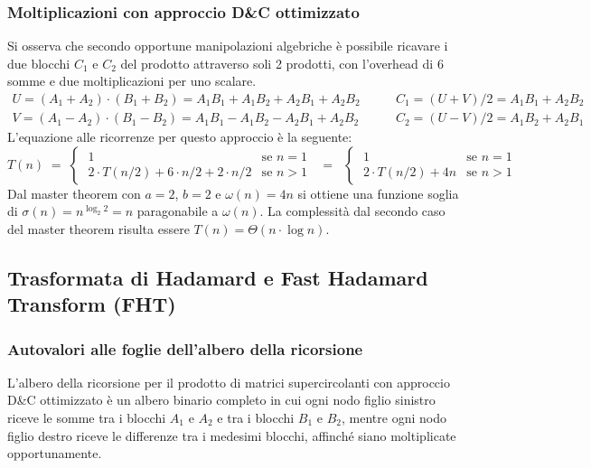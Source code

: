 \subsubsection*{Moltiplicazioni con approccio D\&C ottimizzato}
Si osserva che secondo opportune manipolazioni algebriche è possibile ricavare i due blocchi \(C_1\) e \(C_2\) del prodotto
attraverso soli 2 prodotti, con l'overhead di 6 somme e due moltiplicazioni per uno scalare.
\[\begin{array}{l}
	U = (A_1 + A_2) \cdot (B_1 + B_2) = A_1 B_1 + A_1 B_2 + A_2 B_1 + A_2 B_2 \\[3pt]
	V = (A_1 - A_2) \cdot (B_1 - B_2) = A_1 B_1 - A_1 B_2 - A_2 B_1 + A_2 B_2
\end{array} \qquad \begin{array}{l}
	C_1 = (U + V)/2 = A_1 B_1 + A_2 B_2 \\[3pt]
	C_2 = (U - V)/2 = A_1 B_2 + A_2 B_1
\end{array}\]
L'equazione alle ricorrenze per questo approccio è la seguente:
\[T(n) \; = \; \begin{cases}
	\; 1 & \text{se } n = 1 \\[3pt]
	\; 2 \cdot T(n/2) + 6 \cdot n/2 + 2 \cdot n/2 & \text{se } n > 1
\end{cases} \;\; = \;\; \begin{cases}
	\; 1 & \text{se } n = 1 \\[3pt]
	\; 2 \cdot T(n/2) + 4n & \text{se } n > 1
\end{cases}\]
Dal master theorem con \(a = 2\), \(b = 2\) e \(\omega(n) = 4n\) si ottiene una funzione soglia di
\(\sigma(n) = n^{\log_2 2} = n\) paragonabile a \(\omega(n)\). La complessità dal secondo caso del
master theorem risulta essere \(T(n) = \Theta(n \cdot \log n)\).

\subsection{Trasformata di Hadamard e Fast Hadamard Transform (FHT)}
\subsubsection*{Autovalori alle foglie dell'albero della ricorsione}
L'albero della ricorsione per il prodotto di matrici supercircolanti con approccio D\&C ottimizzato è un albero binario
completo in cui ogni nodo figlio sinistro riceve le somme tra i blocchi \(A_1\) e \(A_2\) e tra i blocchi \(B_1\) e \(B_2\),
mentre ogni nodo figlio destro riceve le differenze tra i medesimi blocchi, affinché siano moltiplicate opportunamente.

